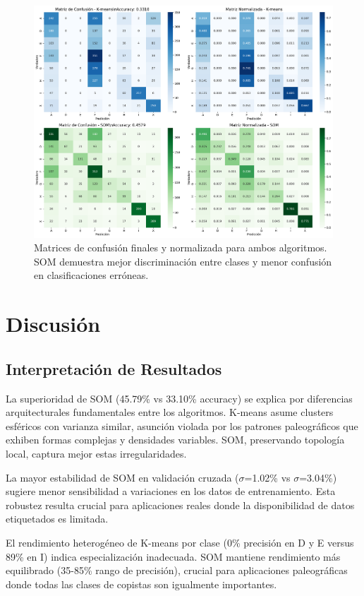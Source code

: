 \documentclass[12pt,a4paper]{article}
\begin{document}
\begin{figure}[H]
    \centering
    \includegraphics[width=\textwidth]{figures/figura__validacion_cruzada_final.pdf}
    \caption{Matrices de confusión finales y normalizada para ambos algoritmos. SOM demuestra mejor discriminación entre clases y menor confusión en clasificaciones erróneas.}
    \label{fig:validacion_final}
\end{figure}

\section{Discusión}

\subsection{Interpretación de Resultados}

La superioridad de SOM (45.79\% vs 33.10\% accuracy) se explica por diferencias arquitecturales fundamentales entre los algoritmos. K-means asume clusters esféricos con varianza similar, asunción violada por los patrones paleográficos que exhiben formas complejas y densidades variables. SOM, preservando topología local, captura mejor estas irregularidades.

La mayor estabilidad de SOM en validación cruzada ($\sigma$=1.02\% vs $\sigma$=3.04\%) sugiere menor sensibilidad a variaciones en los datos de entrenamiento. Esta robustez resulta crucial para aplicaciones reales donde la disponibilidad de datos etiquetados es limitada.

El rendimiento heterogéneo de K-means por clase (0\% precisión en D y E versus 89\% en I) indica especialización inadecuada. SOM mantiene rendimiento más equilibrado (35-85\% rango de precisión), crucial para aplicaciones paleográficas donde todas las clases de copistas son igualmente importantes.
\end{document}
